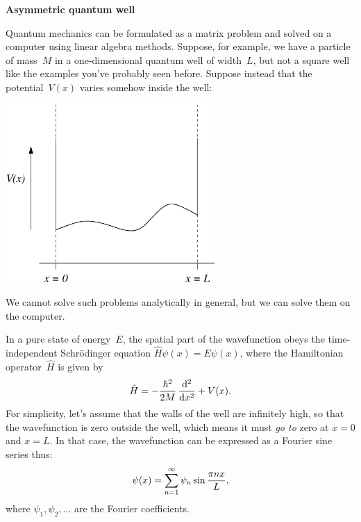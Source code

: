 \documentclass[12pt]{article}
\begin{document}
\begin{exercises}

\exercise \textbf{Asymmetric quantum well}

\exskip Quantum mechanics can be formulated as a matrix problem and solved
on a computer using linear algebra methods.  Suppose, for example, we have
a particle of mass~$M$ in a one-dimensional quantum well of width~$L$, but
not a square well like the examples you've probably seen before.  Suppose
instead that the potential~$V(x)$ varies somehow inside the well: \medskip
\begin{center}
\includegraphics[width=8cm]{well.eps}
\end{center}
We cannot solve such problems analytically in general, but we can solve
them on the computer.

In a pure state of energy~$E$, the spatial part of the wavefunction
obeys the time-independent Schr\"odinger equation $\hat{H}\psi(x) =
E\psi(x)$, where the Hamiltonian operator~$\hat{H}$ is given by
\begin{displaymath}
\hat{H} = - {\hbar^2\over2M}\,{\mathrm{d}^2\over\mathrm{d} x^2} + V(x).
\end{displaymath}
For simplicity, let's assume that the walls of the well are infinitely
high, so that the wavefunction is zero outside the well, which means it
must \emph{go to} zero at $x=0$ and $x=L$.  In that case, the wavefunction
can be expressed as a Fourier sine series thus:
\begin{displaymath}
\psi(x) = \sum_{n=1}^\infty \psi_n \sin {\pi n x\over L},
\end{displaymath}
where $\psi_1,\psi_2,\ldots$ are the Fourier coefficients.


\end{exercises}
\end{document}

